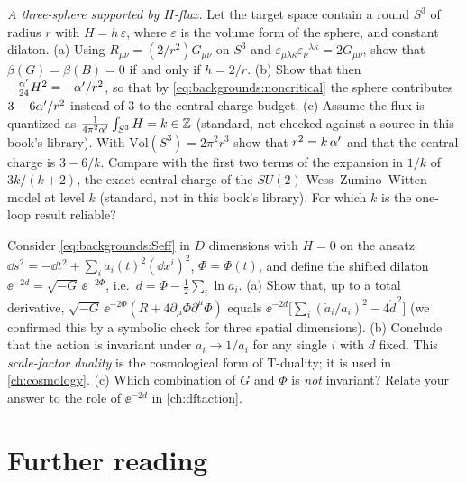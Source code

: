 \begin{exercise}[$\star\star\star$]\label{exr:backgrounds:s3}
\emph{A three-sphere supported by $H$-flux.} Let the target space contain a round $S^3$ of
radius $r$ with $H=h\,\varepsilon$, where $\varepsilon$ is the volume form of the sphere, and
constant dilaton. (a) Using $R_{\mu\nu}=(2/r^2)G_{\mu\nu}$ on $S^3$ and
$\varepsilon_{\mu\lambda\kappa}\varepsilon_\nu{}^{\lambda\kappa}=2G_{\mu\nu}$, show that
$\beta(G)=\beta(B)=0$ if and only if $h=2/r$. (b) Show that then
$-\tfrac{\alpha'}{24}H^2=-\alpha'/r^2$, so that by \eqref{eq:backgrounds:noncritical} the sphere
contributes $3-6\alpha'/r^2$ instead of $3$ to the central-charge budget. (c) Assume the flux is
quantized as $\frac{1}{4\pi^2\alpha'}\int_{S^3}H=k\in\mathbb{Z}$ (standard, not checked against a source in this book's library). With $\mathrm{Vol}(S^3)=2\pi^2r^3$ show that $r^2=k\,\alpha'$ and that the central
charge is $3-6/k$. Compare with the first two terms of the expansion in $1/k$ of $3k/(k+2)$,
the exact central charge of the $SU(2)$ Wess--Zumino--Witten model at level $k$ (standard,
not in this book's library). For which $k$ is the one-loop result reliable?
\end{exercise}

\begin{exercise}[$\star\star\star$]\label{exr:backgrounds:cosmo}
Consider \eqref{eq:backgrounds:Seff} in $D$ dimensions with $H=0$ on the ansatz
$\dd s^2=-\dd t^2+\sum_ia_i(t)^2(\dd x^i)^2$, $\Phi=\Phi(t)$, and define the shifted dilaton
$\ee^{-2d}=\sqrt{-G}\,\ee^{-2\Phi}$, i.e.\ $d=\Phi-\tfrac12\sum_i\ln a_i$. (a) Show that, up
to a total derivative, $\sqrt{-G}\,\ee^{-2\Phi}(R+4\partial_\mu\Phi\partial^\mu\Phi)$ equals
$\ee^{-2d}\bigl[\sum_i(\dot a_i/a_i)^2-4\dot d^{\,2}\bigr]$ (we confirmed this by a symbolic
check for three spatial dimensions). (b) Conclude that the action is
invariant under $a_i\to1/a_i$ for any single $i$ with $d$ fixed. This \emph{scale-factor
duality} is the cosmological form of T-duality; it is used in \cref{ch:cosmology}. (c) Which
combination of $G$ and $\Phi$ is \emph{not} invariant? Relate your answer to the role of
$\ee^{-2d}$ in \cref{ch:dftaction}.
\end{exercise}

\section*{Further reading}

